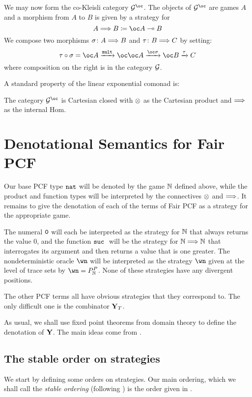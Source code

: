 \documentclass{article}
\begin{document}
We may now form the co-Kleisli category $\G^{\oc}$.  The objects of $\G^{\oc}$ are games $A$ and a morphism from $A$ to $B$ is given by a strategy for
\[
  A \iimpl B \coloneqq \oc A \implies B
  \]
We compose two morphisms $\sigma\colon A\Longrightarrow B$ and $\tau\colon B\Longrightarrow C$ by setting:
\[
  \icomp{\tau}{\sigma} = \oc A \xrightarrow{\mult} \oc \oc A \xrightarrow{\oc \sigma} \oc B \xrightarrow{\tau} C
  \]
where composition on the right is in the category $\mathcal G$.

A standard property of the linear exponential comonad is:

\begin{theorem}
  The category $\G^{\oc}$ is Cartesian closed with $\otimes$ as the Cartesian product and $\Longrightarrow$ as the internal Hom.
\end{theorem}

\section{Denotational Semantics for Fair PCF}

Our base PCF type ${\mathtt{nat}}$ will be denoted by the game $\mathbb{N}$ defined above, while the product and function types will be interpreted by the connectives $\otimes$ and $\Longrightarrow$.  It remains to give the denotation of each of the terms of Fair PCF as a strategy for the appropriate game.

The numeral ${\mathtt{0}}$ will each be interpreted as the strategy for $\mathbb{N}$ that always returns the value $0$, and the function ${\mathtt{suc\;}}$ will be the strategy for $\mathbb{N}\Longrightarrow\mathbb{N}$ that interrogates its argument and then returns a value that is one greater.  The nondeterministic oracle $\wn$ will be interpreted as the strategy $\wn$ given at the level of trace sets by $\wn=P_{\bN}^P$.  None of these strategies have any divergent positions.

The other PCF terms all have obvious strategies that they correspond to.  The only difficult one is the combinator $\mathbf{Y}_T$.  

As usual, we shall use fixed point theorems from domain theory to define the denotation of $\mathbf{Y}$.  The main ideas come from \cite{LairdOrdinalGames}.

\subsection{The stable order on strategies}

We start by defining some orders on strategies.  Our main ordering, which we shall call the \emph{stable ordering} (following \cite{LairdOrdinalGames}) is the order given in \cite{mcCHFiniteND}.
\end{document}
